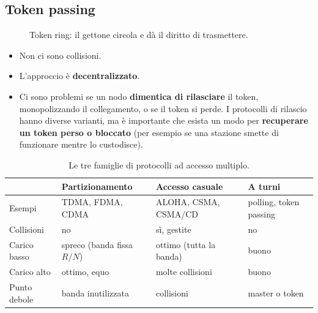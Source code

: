 \subsection{Token passing}


\begin{figure}[H]
\centering
{}
\caption{Token ring: il gettone circola e dà il diritto di trasmettere.}
\end{figure}

\begin{itemize}
    \item[\itick] Non ci sono collisioni.
    \item[\itick] L'approccio è \textbf{decentralizzato}.
    \item[\icross] Ci sono problemi se un nodo \textbf{dimentica di rilasciare} il token, monopolizzando il collegamento, o se il token si perde. I
          protocolli di rilascio hanno diverse varianti, ma è importante che esista un modo per \textbf{recuperare un token perso o bloccato} (per
          esempio se una stazione smette di funzionare mentre lo custodisce).
\end{itemize}

\begin{table}[H]
\centering
\begin{tabular}{p{3.3cm}p{3.6cm}p{3.6cm}p{3.6cm}}
\toprule
 & \textbf{Partizionamento} & \textbf{Accesso casuale} & \textbf{A turni} \\
\midrule
Esempi & TDMA, FDMA, CDMA & ALOHA, CSMA, CSMA/CD & polling, token passing \\
Collisioni & no & sì, gestite & no \\
Carico basso & spreco (banda fissa $R/N$) & ottimo (tutta la banda) & buono \\
Carico alto & ottimo, equo & molte collisioni & buono \\
Punto debole & banda inutilizzata & collisioni & master o token \\
\bottomrule
\end{tabular}
\caption{Le tre famiglie di protocolli ad accesso multiplo.}
\end{table}


